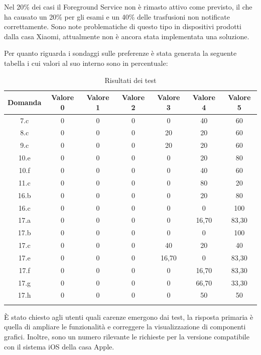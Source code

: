 \documentclass[12pt,a4paper,openright,twoside]{report}
\begin{document}
Nel 20\% dei casi il Foreground Service non è rimasto attivo come previsto, il che ha causato un 20\% per gli esami e un 40\% delle trasfusioni non notificate correttamente. Sono note problematiche di questo tipo in dispositivi prodotti dalla casa Xiaomi, attualmente non è ancora stata implementata una soluzione.

Per quanto riguarda i sondaggi sulle preferenze è stata generata la seguente tabella i cui valori al suo interno sono in percentuale:

\begin{longtable}[c]{|c|c|c|c|c|c|c|}
\hline
\textbf{Domanda} & \textbf{Valore 0} & \textbf{Valore 1} & \textbf{Valore 2} & \textbf{Valore 3} & \textbf{Valore 4} & \textbf{Valore 5} \\ \hline
\endhead
%
7.c  & 0 & 0 & 0 & 0     & 40    & 60    \\ \hline
8.c  & 0 & 0 & 0 & 20    & 20    & 60    \\ \hline
9.c  & 0 & 0 & 0 & 20    & 20    & 60    \\ \hline
10.e & 0 & 0 & 0 & 0     & 20    & 80    \\ \hline
10.f & 0 & 0 & 0 & 0     & 40    & 60    \\ \hline
11.c & 0 & 0 & 0 & 0     & 80    & 20    \\ \hline
16.b & 0 & 0 & 0 & 0     & 20    & 80    \\ \hline
16.c & 0 & 0 & 0 & 0     & 0     & 100   \\ \hline
17.a & 0 & 0 & 0 & 0     & 16,70 & 83,30 \\ \hline
17.b & 0 & 0 & 0 & 0     & 0     & 100   \\ \hline
17.c & 0 & 0 & 0 & 40    & 20    & 40    \\ \hline
17.e & 0 & 0 & 0 & 16,70 & 0     & 83,30 \\ \hline
17.f & 0 & 0 & 0 & 0     & 16,70 & 83,30 \\ \hline
17.g & 0 & 0 & 0 & 0     & 66,70 & 33,30 \\ \hline
17.h & 0 & 0 & 0 & 0     & 50    & 50    \\ \hline
\caption{Risultati dei test}
\label{Risultati}\\
\end{longtable}

\`E stato chiesto agli utenti quali carenze emergono dai test, la risposta primaria è quella di ampliare le funzionalità e correggere la visualizzazione di componenti grafici. Inoltre, sono un numero rilevante le richieste per la versione compatibile con il sistema iOS della casa Apple.
\end{document}
